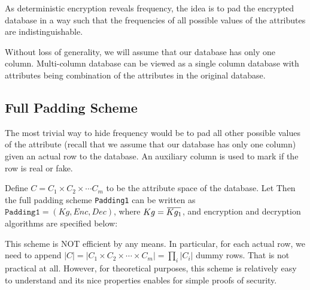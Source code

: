 \documentclass[10pt]{book}
\newcommand{\overbar}[1]{\mkern 1.5mu\overline{\mkern-1.5mu#1\mkern-1.5mu}\mkern 1.5mu}
\begin{document}
As deterministic encryption reveals frequency, the idea is to pad the encrypted database in a way such that the frequencies of all possible values of the attributes are indistinguishable.

Without loss of generality, we will assume that our database has only one column. Multi-column database can be viewed as a single column database with attributes being combination of the attributes in the original database.


\subsection{Full Padding Scheme}
The most trivial way to hide frequency would be to pad all other possible values of the attribute (recall that we assume that our database has only one column) given an actual row to the database. An auxiliary column is used to mark if the row is real or fake.

Define $C = C_1 \times C_2 \times \cdots C_m$ to be the attribute space of the database. Let Then the full padding scheme \texttt{Padding1} can be written as $\texttt{{Padding1}} = (Kg, Enc, Dec)$, where $Kg = \overbar{Kg_1}$, and encryption and decryption algorithms are specified below:

\begin{pchstack}
	
	\pchspace
\end{pchstack}

This scheme is NOT efficient by any means. In particular, for each actual row, we need to append $|C| = |C_1 \times C_2 \times \cdots \times C_m| = \prod_i |C_i|$ dummy rows. That is not practical at all. However, for theoretical purposes, this scheme is relatively easy to understand and its nice properties enables for simple proofs of security.
\end{document}

